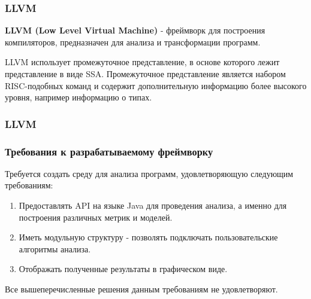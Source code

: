 \documentclass{beamer}
\begin{document}
\begin{frame}
\frametitle{LLVM}

\textbf{LLVM (Low Level Virtual Machine)} - фреймворк для построения компиляторов,
предназначен для анализа и трансформации программ.

\vspace{0.4cm}

LLVM использует промежуточное представление, в основе которого лежит
представление в виде SSA. Промежуточное представление является набором
RISC-подобных команд и содержит дополнительную информацию более высокого уровня,
например информацию о типах.

\end{frame}

\begin{frame}
\frametitle{LLVM}


\end{frame}

\begin{frame}
\frametitle{Требования к разрабатываемому фреймворку}

Требуется создать среду для анализа программ, удовлетворяющую следующим
требованиям:

\begin{enumerate}
    \item Предоставлять API на языке Java для проведения анализа, а именно для
    построения различных метрик и моделей.
    \item Иметь модульную структуру - позволять подключать пользовательские
    алгоритмы анализа.
    \item Отображать полученные результаты в графическом виде.
\end{enumerate}

Все вышеперечисленные решения данным требованиям не удовлетворяют.

\pause

\begin{alertblock}{}
\end{alertblock}

\end{frame}
\end{document}
